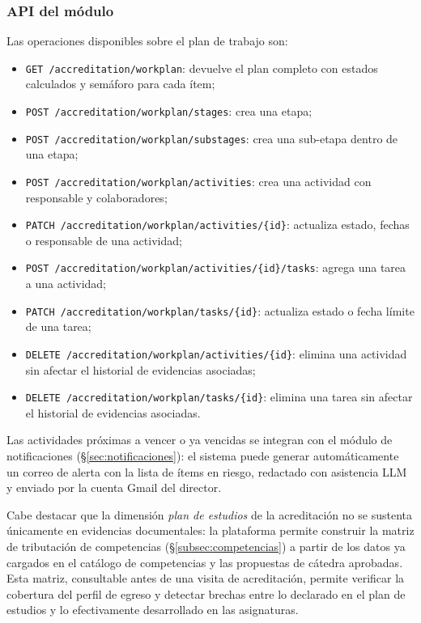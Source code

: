 \subsubsection*{API del módulo}

Las operaciones disponibles sobre el plan de trabajo son:

\begin{itemize}[noitemsep, topsep=2pt]
  \item \texttt{GET /accreditation/workplan}: devuelve el plan completo
    con estados calculados y semáforo para cada ítem;
  \item \texttt{POST /accreditation/workplan/stages}: crea una etapa;
  \item \texttt{POST /accreditation/workplan/substages}: crea una
    sub-etapa dentro de una etapa;
  \item \texttt{POST /accreditation/workplan/activities}: crea una
    actividad con responsable y colaboradores;
  \item \texttt{PATCH /accreditation/workplan/activities/\{id\}}: actualiza
    estado, fechas o responsable de una actividad;
  \item \texttt{POST /accreditation/workplan/activities/\{id\}/tasks}: agrega
    una tarea a una actividad;
  \item \texttt{PATCH /accreditation/workplan/tasks/\{id\}}: actualiza
    estado o fecha límite de una tarea;
  \item \texttt{DELETE /accreditation/workplan/activities/\{id\}}: elimina
    una actividad sin afectar el historial de evidencias asociadas;
  \item \texttt{DELETE /accreditation/workplan/tasks/\{id\}}: elimina
    una tarea sin afectar el historial de evidencias asociadas.
\end{itemize}

Las actividades próximas a vencer o ya vencidas se integran con el módulo
de notificaciones (\S\ref{sec:notificaciones}): el sistema puede generar
automáticamente un correo de alerta con la lista de ítems en riesgo,
redactado con asistencia LLM y enviado por la cuenta Gmail del director.

Cabe destacar que la dimensión \emph{plan de estudios} de la acreditación
no se sustenta únicamente en evidencias documentales: la plataforma
permite construir la matriz de tributación de competencias
(\S\ref{subsec:competencias}) a partir de los datos ya cargados en el
catálogo de competencias y las propuestas de cátedra aprobadas.
Esta matriz, consultable antes de una visita de acreditación, permite
verificar la cobertura del perfil de egreso y detectar brechas entre
lo declarado en el plan de estudios y lo efectivamente desarrollado
en las asignaturas.

